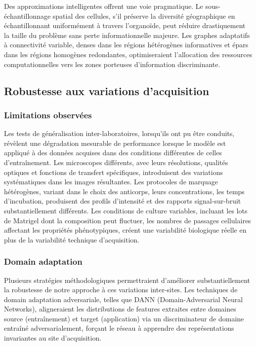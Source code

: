 Des approximations intelligentes offrent une voie pragmatique. Le sous-échantillonnage spatial des cellules, s'il préserve la diversité géographique en échantillonnant uniformément à travers l'organoïde, peut réduire drastiquement la taille du problème sans perte informationnelle majeure. Les graphes adaptatifs à connectivité variable, denses dans les régions hétérogènes informatives et épars dans les régions homogènes redondantes, optimiseraient l'allocation des ressources computationnelles vers les zones porteuses d'information discriminante.

\subsection{Robustesse aux variations d'acquisition}

\subsubsection{Limitations observées}

Les tests de généralisation inter-laboratoires, lorsqu'ils ont pu être conduits, révèlent une dégradation mesurable de performance lorsque le modèle est appliqué à des données acquises dans des conditions différentes de celles d'entraînement. Les microscopes différents, avec leurs résolutions, qualités optiques et fonctions de transfert spécifiques, introduisent des variations systématiques dans les images résultantes. Les protocoles de marquage hétérogènes, variant dans le choix des anticorps, leurs concentrations, les temps d'incubation, produisent des profils d'intensité et des rapports signal-sur-bruit substantiellement différents. Les conditions de culture variables, incluant les lots de Matrigel dont la composition peut fluctuer, les nombres de passages cellulaires affectant les propriétés phénotypiques, créent une variabilité biologique réelle en plus de la variabilité technique d'acquisition.

\subsubsection{Domain adaptation}

Plusieurs stratégies méthodologiques permettraient d'améliorer substantiellement la robustesse de notre approche à ces variations inter-sites. Les techniques de domain adaptation adversariale, telles que DANN (Domain-Adversarial Neural Networks), aligneraient les distributions de features extraites entre domaines source (entraînement) et target (application) via un discriminateur de domaine entraîné adversarialement, forçant le réseau à apprendre des représentations invariantes au site d'acquisition.

